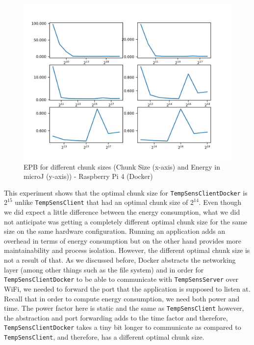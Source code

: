 \begin{figure}
    \begin{center}
        \includegraphics[scale=0.23]{Figs/dockerenergy.png}    
    \end{center}
    \caption{EPB for different chunk sizes (Chunk Size (x-axis) and Energy in microJ (y-axis)) - Raspberry Pi 4 (Docker)}
    \label{fig:dockerenergy}
\end{figure}

This experiment shows that the optimal chunk size for \texttt{TempSensClientDocker} is $2^{15}$ unlike \texttt{TempSensClient} 
that had an optimal chunk size of $2^{14}$. Even though we did expect a little difference between the energy 
consumption, what we did not anticipate was getting a completely different optimal chunk size for the same size on 
the same hardware configuration. Running an application adds an overhead in terms of energy consumption but on the 
other hand provides more maintainability and process isolation. However, the different optimal chunk size is not 
a result of that. As we discussed before, Docker abstracts the networking layer (among other things such as the file 
system) and in order for \texttt{TempSensClientDocker} to be able to communicate with \texttt{TempSensServer} over 
WiFi, we needed to forward the port that the application is supposed to listen at. Recall that in order to compute 
energy consumption, we need both power and time. The power factor here is static and the same as \texttt{TempSensClient} 
however, the abstraction and port forwarding adds to the time factor and therefore, \texttt{TempSensClientDocker} takes 
a tiny bit longer to communicate as compared to \texttt{TempSensClient}, and therefore, has a different optimal chunk size. \\

